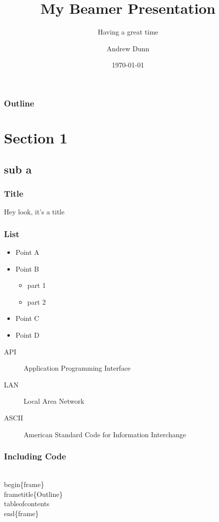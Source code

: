 \documentclass{beamer}
\title{My Beamer Presentation}
\subtitle{Having a great time}
\author{Andrew Dunn}
\institute{Central Washington University}
\date{\today}
\begin{document}
    \begin{frame}
        \titlepage
    \end{frame}
    
    \begin{frame}
        \frametitle{Outline}
        \tableofcontents
    \end{frame}
    
    \section{Section 1}
    \subsection{sub a}
     
    \begin{frame}
        \frametitle{Title}
        Hey look, it's a \alert{title}
    \end{frame}
    
    \begin{frame}
        \frametitle{List}
        \begin{itemize}
            \item Point A
            \item Point B
            \begin{itemize}
                \item part 1
                \item part 2
            \end{itemize}
            \item Point C
            \item Point D
        \end{itemize}
    \end{frame}
    
    \begin{frame}
        \begin{description}
            \item[API] Application Programming Interface
            \item[LAN] Local Area Network
            \item[ASCII] American Standard Code for Information Interchange
        \end{description}
    \end{frame}
    
    \begin{frame}[fragile]
        \frametitle{Including Code}
        \begin{semiverbatim}
            \\begin\{frame\}
            \\frametitle\{Outline\}
            \\tableofcontents
            \\end\{frame\}
        \end{semiverbatim}
    \end{frame}
    
\end{document}
